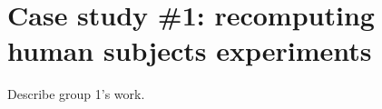 \section{Case study \#1: recomputing human subjects experiments}
\label{s:group1}

Describe group 1's work.
